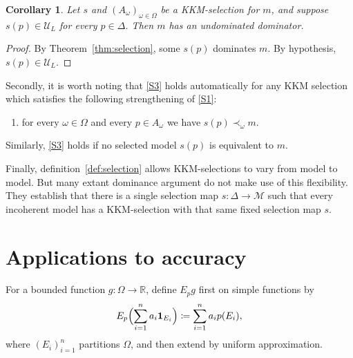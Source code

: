 \documentclass[11pt]{article}
\newtheorem{corollary}[theorem]{Corollary}
\theoremstyle{definition}
\theoremstyle{remark}
\newcommand{\M}{\mathcal M}
\newcommand{\U}{\mathcal U}
\begin{document}
\begin{corollary}\label{cor:undominated-dominators}
Let $s$ and $(A_\omega)_{\omega\in\Omega}$ be a KKM-selection for $m$, and suppose $s(p)\in\U_L$ for every $p\in\Delta$. Then $m$ has an undominated dominator.
\end{corollary}
\begin{proof}
By Theorem~\ref{thm:selection}, some $s(p)$ dominates $m$. By hypothesis, $s(p)\in\U_L$.
\end{proof}

Secondly, it is worth noting that \ref{S3} holds automatically for any KKM selection which satisfies the following strengthening of \ref{S1}:
\begin{enumerate}[label=(S\arabic*$^\prime$),leftmargin=3em]
\item\label{S1'} for every $\omega\in\Omega$ and every $p\in A_\omega$ we have $s(p)\prec_\omega m$.
\end{enumerate}
\noindent Similarly, \ref{S3} holds if no selected model $s(p)$ is equivalent to $m$.


Finally, definition~\ref{def:selection} allows KKM-selections to vary from model to model. But many extant dominance argument do not make use of this flexibility. They establish that there is a single selection map $s:\Delta\to\M$ such that every incoherent model has a KKM-selection with that same fixed selection map $s$. %









\section{Applications to accuracy}\label{sec:applications}

For a bounded function $g:\Omega\to\mathbb R$, define $E_pg$ first on simple functions by
\[
E_p\Bigl(\sum_{i=1}^n a_i\mathbf1_{E_i}\Bigr)
\coloneqq\sum_{i=1}^n a_i p(E_i),
\]
where $(E_i)_{i=1}^n$ partitions $\Omega$, and then extend by uniform approximation.
\end{document}

